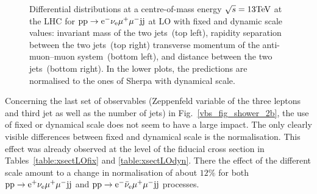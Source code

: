 \begin{figure}[htbp]
\begin{center}
\caption{Differential distributions at a centre-of-mass energy $\sqrt{s}=13{\rm TeV}$ at the LHC for ${\rm p} {\rm p}
  \to {\rm e}^-  \nu_{\rm e}  \mu^+ \mu^- {\rm j} {\rm j}$ at LO with fixed and dynamic scale values:  
                invariant mass of the two jets~(top left),
                rapidity separation between the two jets~(top right)
                transverse momentum of the anti-muon--muon system~(bottom left), and
                distance between the two jets~(bottom right).
                In the lower plots, the predictions are normalised to the ones of {\sc Sherpa} with dynamical scale.}
\label{vbs_fig_shower_2a}
\end{center}
\end{figure}

Concerning the last set of observables (Zeppenfeld variable of the three leptons and third jet as well as the number of jets) in Fig.~\ref{vbs_fig_shower_2b}, the use of fixed or dynamical scale does not seem to have a large impact.
The only clearly visible differences between fixed and dynamical scale is the normalisation.
This effect was already observed at the level of the fiducial cross section in Tables~\ref{table:xsectLOfix} and \ref{table:xsectLOdyn}.
There the effect of the different scale amount to a change in normalisation of about $12\%$ for both ${\rm p}{\rm p}\to{\rm e}^+\nu_{\rm e}\mu^+\mu^-{\rm j}{\rm j}$ and ${\rm p}{\rm p}\to{\rm e}^-\bar\nu_{\rm e}\mu^+\mu^-{\rm j}{\rm j}$ processes.

